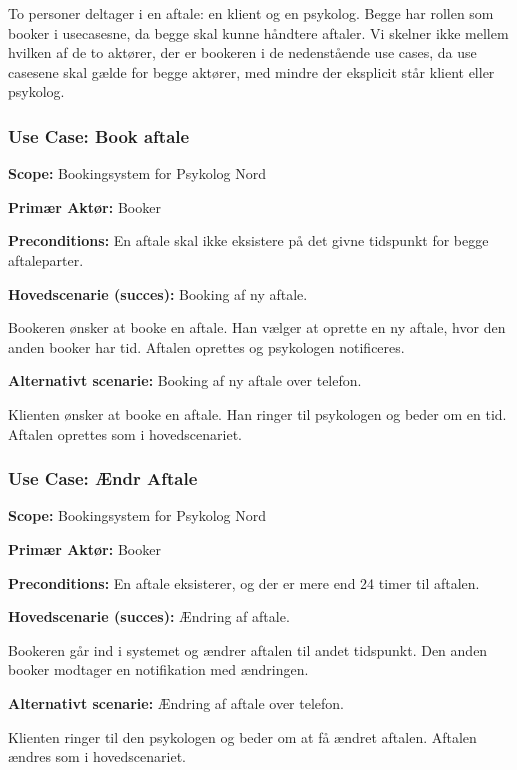 To personer deltager i en aftale: en klient og en psykolog. Begge har rollen som booker i usecasesne, da begge skal kunne håndtere aftaler. 
Vi skelner ikke mellem hvilken af de to aktører, der er bookeren i de nedenstående use cases, da use casesene skal gælde for begge aktører, med mindre der eksplicit står klient eller psykolog.

\subsubsection{Use Case: Book aftale}\label{usecase:bookaftale}
{\setlength{\parindent}{0cm}
\textbf{Scope:} Bookingsystem for Psykolog Nord

\textbf{Primær Aktør:} Booker

\textbf{Preconditions:} En aftale skal ikke eksistere på det givne tidspunkt for begge aftaleparter.

\textbf{Hovedscenarie (succes):} Booking af ny aftale.

Bookeren ønsker at booke en aftale. 
Han vælger at oprette en ny aftale, hvor den anden booker har tid. 
Aftalen oprettes og psykologen notificeres.

\textbf{Alternativt scenarie:} Booking af ny aftale over telefon.

Klienten ønsker at booke en aftale. Han ringer til psykologen og beder om en tid. Aftalen oprettes som i hovedscenariet.
}

\subsubsection{Use Case: Ændr Aftale}
{\setlength{\parindent}{0cm}
\textbf{Scope:} Bookingsystem for Psykolog Nord

\textbf{Primær Aktør:} Booker 

\textbf{Preconditions:} En aftale eksisterer, og der er mere end 24 timer til aftalen.

\textbf{Hovedscenarie (succes):} Ændring af aftale.

Bookeren går ind i systemet og ændrer aftalen til andet tidspunkt.
Den anden booker modtager en notifikation med ændringen.

\textbf{Alternativt scenarie:} Ændring af aftale over telefon.

Klienten ringer til den psykologen og beder om at få ændret aftalen.
Aftalen ændres som i hovedscenariet.
}

